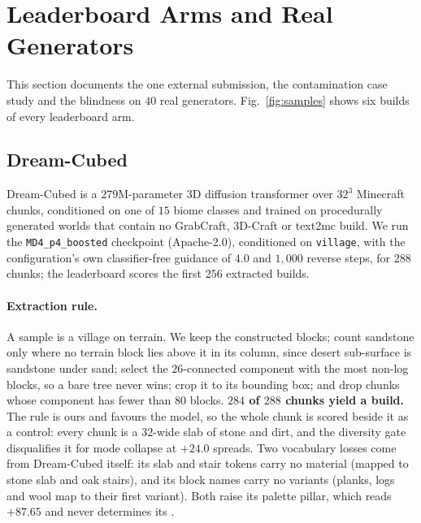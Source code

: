 \section{Leaderboard Arms and Real Generators}
\label{app:leaderboard}

This section documents the one external submission, the contamination case study
and the blindness on $40$ real generators. Fig.~\ref{fig:samples} shows six builds of
every leaderboard arm.

\subsection{Dream-Cubed}
\label{app:dreamcubed}

Dream-Cubed \citep{merino2026dreamcubed} is a $279$M-parameter 3D diffusion transformer
over $32^3$ Minecraft chunks, conditioned on one of $15$ biome classes and trained on
procedurally generated worlds that contain no GrabCraft, 3D-Craft or text2mc build. We run
the \texttt{MD4\_p4\_boosted} checkpoint (Apache-2.0), conditioned on \texttt{village},
with the configuration's own classifier-free guidance of $4.0$ and $1{,}000$ reverse steps,
for $288$ chunks; the leaderboard scores the first $256$ extracted builds.

\paragraph{Extraction rule.} A sample is a village on terrain. We keep the constructed
blocks; count sandstone only where no terrain block lies above it in its column, since
desert sub-surface is sandstone under sand; select the $26$-connected component with the
most non-log blocks, so a bare tree never wins; crop it to its bounding box; and drop chunks
whose component has fewer than $80$ blocks. \textbf{$284$ of $288$ chunks yield a build.}
The rule is ours and favours the model, so the whole chunk is scored beside it as a control:
every chunk is a $32$-wide slab of stone and dirt, and the diversity gate disqualifies it
for mode collapse at $+24.0$ spreads. Two vocabulary losses come from Dream-Cubed itself:
its slab and stair tokens carry no material (mapped to stone slab and oak stairs), and its
block names carry no variants (planks, logs and wool map to their first variant). Both
raise its palette pillar, which reads $+87.65$ and never determines its \blockscore{}.

